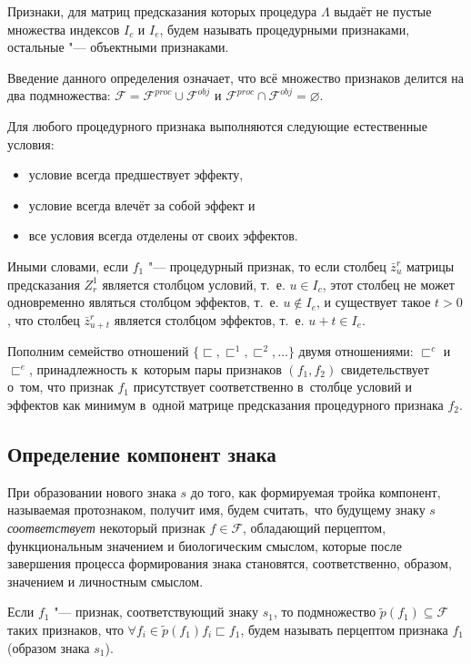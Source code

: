 \begin{Def}
	Признаки, для матриц предсказания которых процедура $\Lambda$ выдаёт не пустые множества индексов $I_c$ и $I_e$, будем называть процедурными признаками, остальные "--- объектными признаками.
\end{Def}

Введение данного определения означает, что всё множество признаков делится на два подмножества: $\mathcal F=\mathcal F^{proc}\cup\mathcal F^{obj}$ и $\mathcal F^{proc}\cap\mathcal F^{obj}=\varnothing$.

Для любого процедурного признака выполняются следующие естественные условия:
\begin{itemize}
	\item условие всегда предшествует эффекту,
	\item условие всегда влечёт за собой эффект и
	\item все условия всегда отделены от своих эффектов.
\end{itemize}

Иными словами, если $f_1$ "--- процедурный признак, то если столбец $\bar z_u^r$ матрицы предсказания $Z_r^1$ является столбцом условий, т.~е. $u\in{I_c}$, этот столбец не может одновременно являться столбцом эффектов, т.~е. $u\not\in I_e$, и существует такое $t>0$, что столбец $\bar z_{u+t}^r$ является столбцом эффектов, т.~е. $u+t\in I_e$.

Пополним семейство отношений $\{\sqsubset,\sqsubset^1,\sqsubset^2,\dots\}$ двумя отношениями: $\sqsubset^c$ и $\sqsubset^e$, принадлежность к~которым пары признаков $(f_1,f_2)$ свидетельствует о~том, что признак $f_1$ присутствует соответственно в~столбце условий и эффектов как минимум в~одной матрице предсказания процедурного признака $f_2$.

\subsection{Определение компонент знака}

При образовании нового знака $s$ до того, как формируемая тройка компонент, называемая протознаком, получит имя, будем считать,~что будущему знаку $s$ \textit{соответствует} некоторый признак $f\in\mathcal F$, обладающий перцептом, функциональным значением и биологическим смыслом, которые после завершения процесса формирования знака становятся, соответственно, образом, значением и личностным смыслом.
\begin{Def}
	Если $f_1$ "--- признак, соответствующий знаку $s_1$, то подмножество $\tilde p(f_1)\subseteq\mathcal F$ таких признаков, что $\forall f_i\in\tilde p(f_1) f_i\sqsubset f_1$, будем называть перцептом признака $f_1$ (образом знака $s_1$).
\end{Def}

